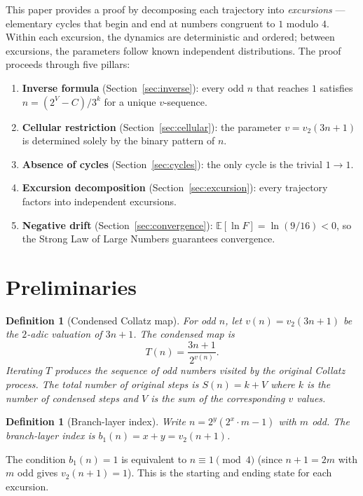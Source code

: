 \documentclass[12pt,a4paper]{article}
\newtheorem{definition}[theorem]{Definition}
\newcommand{\E}{\mathbb{E}}
\begin{document}
This paper provides a proof by decomposing each trajectory into \emph{excursions} --- elementary cycles that begin and end at numbers congruent to $1$ modulo $4$. Within each excursion, the dynamics are deterministic and ordered; between excursions, the parameters follow known independent distributions. The proof proceeds through five pillars:
\begin{enumerate}[(P1)]
\item \textbf{Inverse formula} (Section~\ref{sec:inverse}): every odd $n$ that reaches $1$ satisfies $n = (2^V - C)/3^k$ for a unique $v$-sequence.
\item \textbf{Cellular restriction} (Section~\ref{sec:cellular}): the parameter $v = v_2(3n+1)$ is determined solely by the binary pattern of $n$.
\item \textbf{Absence of cycles} (Section~\ref{sec:cycles}): the only cycle is the trivial $1 \to 1$.
\item \textbf{Excursion decomposition} (Section~\ref{sec:excursion}): every trajectory factors into independent excursions.
\item \textbf{Negative drift} (Section~\ref{sec:convergence}): $\E[\ln F] = \ln(9/16) < 0$, so the Strong Law of Large Numbers guarantees convergence.
\end{enumerate}

\section{Preliminaries}\label{sec:prelim}

\begin{definition}[Condensed Collatz map]\label{def:condensed}
For odd $n$, let $v(n) = v_2(3n+1)$ be the $2$-adic valuation of $3n+1$. The \emph{condensed} map is
\[
T(n) = \frac{3n+1}{2^{v(n)}}.
\]
Iterating $T$ produces the sequence of odd numbers visited by the original Collatz process. The total number of original steps is $S(n) = k + V$ where $k$ is the number of condensed steps and $V$ is the sum of the corresponding $v$ values.
\end{definition}

\begin{definition}[Branch-layer index]\label{def:bl}
Write $n = 2^y (2^x \cdot m - 1)$ with $m$ odd. The \emph{branch-layer index} is $b_1(n) = x + y = v_2(n+1)$.
\end{definition}

The condition $b_1(n) = 1$ is equivalent to $n \equiv 1 \pmod 4$ (since $n+1 = 2m$ with $m$ odd gives $v_2(n+1) = 1$). This is the starting and ending state for each excursion.
\end{document}
